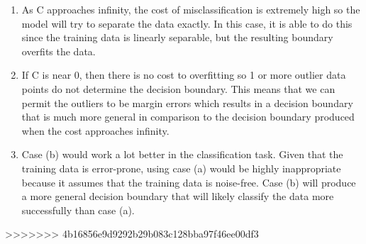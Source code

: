 \documentclass{article}
\begin{document}
\begin{enumerate}
\begin{enumerate}
\begin{figure}[h]
		\end{figure}
		\item
		As C approaches infinity, the cost of misclassification is extremely high so the model will try to separate the data exactly.  In this case, it is able to do this since the training data is linearly separable, but the resulting boundary overfits the data. 
		\item
		If C is near 0, then there is no cost to overfitting so 1 or more outlier data points do not determine the decision boundary. This means that we can permit the outliers to be margin errors which results in a decision boundary that is much more general in comparison to the decision boundary produced when the cost approaches infinity.
		\item
		Case (b) would work a lot better in the classification task. Given that the training data is error-prone, using case (a) would be highly inappropriate because it assumes that the training data is noise-free. Case (b) will produce a more general decision boundary that will likely classify the data more successfully than case (a). 
	\end{enumerate}
>>>>>>> 4b16856e9d9292b29b083c128bba97f46ee00df3
\end{enumerate}
\end{document}
